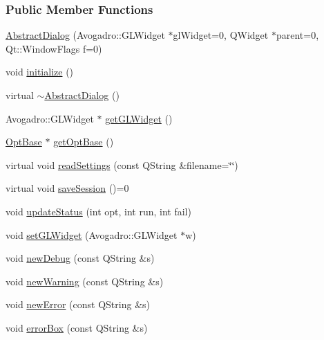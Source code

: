 \subsubsection*{Public Member Functions}
\begin{DoxyCompactItemize}
\item 
\hyperlink{classGlobalSearch_1_1AbstractDialog_a44af0af55038d330e284d3ddc567dd3f}{Abstract\+Dialog} (Avogadro\+::\+G\+L\+Widget $\ast$gl\+Widget=0, Q\+Widget $\ast$parent=0, Qt\+::\+Window\+Flags f=0)
\item 
void \hyperlink{classGlobalSearch_1_1AbstractDialog_aea19edd77198f2e6155002f53a61add6}{initialize} ()
\item 
virtual \hyperlink{classGlobalSearch_1_1AbstractDialog_a55ebf148332cc0eca585e816bda871ae}{$\sim$\+Abstract\+Dialog} ()
\item 
Avogadro\+::\+G\+L\+Widget $\ast$ \hyperlink{classGlobalSearch_1_1AbstractDialog_a4823851b13319cd2a4384c00346faf22}{get\+G\+L\+Widget} ()
\item 
\hyperlink{classGlobalSearch_1_1OptBase}{Opt\+Base} $\ast$ \hyperlink{classGlobalSearch_1_1AbstractDialog_ad2fe5c3c110152b29207b54df72dbd45}{get\+Opt\+Base} ()
\item 
virtual void \hyperlink{classGlobalSearch_1_1AbstractDialog_aa798b5d3d1099bce37207a3f15b0eb6a}{read\+Settings} (const Q\+String \&filename=\char`\"{}\char`\"{})
\item 
virtual void \hyperlink{classGlobalSearch_1_1AbstractDialog_a6e9ef21da0b2e60513a11f7de55ffbd7}{save\+Session} ()=0
\item 
void \hyperlink{classGlobalSearch_1_1AbstractDialog_a40bbc9eb104fe418e1fb2ba93bd2a2ae}{update\+Status} (int opt, int run, int fail)
\item 
void \hyperlink{classGlobalSearch_1_1AbstractDialog_a861a8ddbb5ca235f5966737755911aa3}{set\+G\+L\+Widget} (Avogadro\+::\+G\+L\+Widget $\ast$w)
\item 
void \hyperlink{classGlobalSearch_1_1AbstractDialog_a7353bd5b3393faf017287674691e56c6}{new\+Debug} (const Q\+String \&s)
\item 
void \hyperlink{classGlobalSearch_1_1AbstractDialog_abe3084783126e2d1f09c9250c11f8f39}{new\+Warning} (const Q\+String \&s)
\item 
void \hyperlink{classGlobalSearch_1_1AbstractDialog_ae0b664aa133ded37df0dc5f7a040f0c5}{new\+Error} (const Q\+String \&s)
\item 
void \hyperlink{classGlobalSearch_1_1AbstractDialog_aee94863a2a275b8a91613b191451bc1e}{error\+Box} (const Q\+String \&s)
\end{DoxyCompactItemize}
